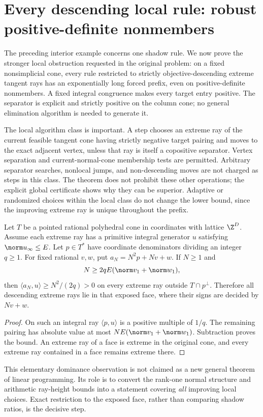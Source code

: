 \section{Every descending local rule: robust positive-definite nonmembers}\label{sec:alllocal}
The preceding interior example concerns one shadow rule. We now prove the stronger local obstruction requested in the original problem: on a fixed nonsimplicial cone, every rule restricted to strictly objective-descending extreme tangent rays has an exponentially long forced prefix, even on positive-definite nonmembers. A fixed integral congruence makes every target entry positive. The separator is explicit and strictly positive on the column cone; no general elimination algorithm is needed to generate it.

The local algorithm class is important. A step chooses an extreme ray of the current feasible tangent cone having strictly negative target pairing and moves to the exact adjacent vertex, unless that ray is itself a copositive separator. Vertex separation and current-normal-cone membership tests are permitted. Arbitrary separator searches, nonlocal jumps, and non-descending moves are not charged as steps in this class. The theorem does not prohibit these other operations; the explicit global certificate shows why they can be superior. Adaptive or randomized choices within the local class do not change the lower bound, since the improving extreme ray is unique throughout the prefix.

\begin{lemma}\label{lem:integralgap}
Let $T$ be a pointed rational polyhedral cone in coordinates with lattice $\Z^D$. Assume each extreme ray has a primitive integral generator $u$ satisfying $\norm u_\infty\le E$. Let $p\in T^*$ have coordinate denominators dividing an integer $q\ge1$. For fixed rational $v,w$, put $a_N=N^2p+Nv+w$. If $N\ge1$ and
\[
 N\ge 2qE(\norm v_1+\norm w_1),
\]
then $\langle a_N,u\rangle\ge N^2/(2q)>0$ on every extreme ray outside $T\cap p^\perp$. Therefore all descending extreme rays lie in that exposed face, where their signs are decided by $Nv+w$.
\end{lemma}
\begin{proof}
On such an integral ray $\langle p,u\rangle$ is a positive multiple of $1/q$. The remaining pairing has absolute value at most $NE(\norm v_1+\norm w_1)$. Subtraction proves the bound. An extreme ray of a face is extreme in the original cone, and every extreme ray contained in a face remains extreme there.
\end{proof}
This elementary dominance observation is not claimed as a new general theorem of linear programming. Its role is to convert the rank-one normal structure and arithmetic ray-height bounds into a statement covering \emph{all} improving local choices. Exact restriction to the exposed face, rather than comparing shadow ratios, is the decisive step.


